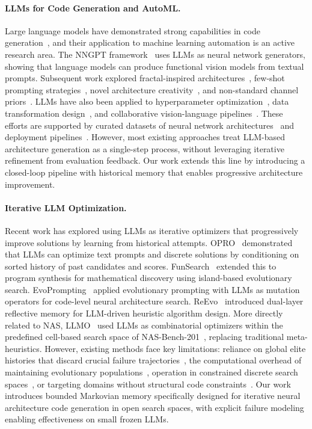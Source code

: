 \documentclass[10pt,twocolumn,letterpaper]{article}
\begin{document}
	\paragraph{LLMs for Code Generation and AutoML.}
	Large language models have demonstrated strong capabilities in code generation~\cite{Chen2021Codex}, and their application to machine learning automation is an active research area. The NNGPT framework~\cite{ABrain.NNGPT} uses LLMs as neural network generators, showing that language models can produce functional vision models from textual prompts. Subsequent work explored fractal-inspired architectures~\cite{ABrain.NNGPT-Fractal}, few-shot prompting strategies~\cite{ABrain.Prompt}, novel architecture creativity~\cite{ABrain.Architect}, and non-standard channel priors~\cite{ABrain.CV_Channel}. LLMs have also been applied to hyperparameter optimization~\cite{ABrain.HPGPT}, data transformation design~\cite{ABrain.Transform}, and collaborative vision-language pipelines~\cite{Rupani2025llm,Gado2025llm,ABrain.NN-RAG}. These efforts are supported by curated datasets of neural network architectures~\cite{ABrain.NN-Dataset,ABrain.LEMUR2} and deployment pipelines~\cite{ABrain.NN-Lite}. However, most existing approaches treat LLM-based architecture generation as a single-step process, without leveraging iterative refinement from evaluation feedback. Our work extends this line by introducing a closed-loop pipeline with historical memory that enables progressive architecture improvement.
	
	\paragraph{Iterative LLM Optimization.}
	Recent work has explored using LLMs as iterative optimizers that progressively 
	improve solutions by learning from historical attempts. OPRO~\cite{Yang2023OPRO} 
	demonstrated that LLMs can optimize text prompts and discrete solutions by 
	conditioning on sorted history of past candidates and scores. FunSearch~\cite{Romera2023FunSearch} 
	extended this to program synthesis for mathematical discovery using island-based 
	evolutionary search. EvoPrompting~\cite{Chen2023EvoPrompting} applied evolutionary 
	prompting with LLMs as mutation operators for code-level neural architecture 
	search. ReEvo~\cite{Ye2024ReEvo} introduced dual-layer reflective memory for 
	LLM-driven heuristic algorithm design. More directly related to NAS, 
	LLMO~\cite{Zhong2024LLMO} used LLMs as combinatorial optimizers within the 
	predefined cell-based search space of NAS-Bench-201~\cite{dong2020nas}, replacing traditional 
	meta-heuristics. However, existing methods face key limitations: reliance on 
	global elite histories that discard crucial failure trajectories~\cite{Yang2023OPRO,Romera2023FunSearch}, 
	the computational overhead of maintaining evolutionary populations~\cite{Chen2023EvoPrompting}, 
	operation in constrained discrete search spaces~\cite{Zhong2024LLMO}, or 
	targeting domains without structural code constraints~\cite{Ye2024ReEvo}. Our work introduces 
	bounded Markovian memory specifically designed for iterative neural architecture 
	code generation in open search spaces, with explicit failure modeling enabling 
	effectiveness on small frozen LLMs.
\end{document}
